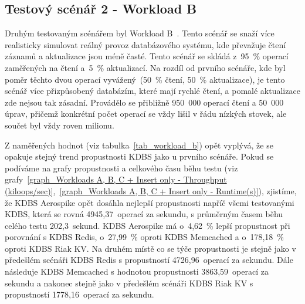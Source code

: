 \documentclass[czech,master,dept460,male,csharp,cpdeclaration]{diploma}
\begin{document}
	\subsection{Testový scénář 2 - Workload B}
	
	Druhým testovaným scénářem byl Workload B~\cite{workloads}. Tento scénář se snaží více realisticky simulovat reálný provoz databázového systému, kde převažuje čtení záznamů a aktualizace jsou méně časté. Tento scénář se skládá z~95~\% operací zaměřených na čtení a~5~\% aktualizací. Na rozdíl od prvního scénáře, kde byl poměr těchto dvou operací vyvážený~(50~\% čtení, 50~\% aktualizace), je tento scénář více přizpůsobený databázím, které mají rychlé čtení, a pomalé aktualizace zde nejsou tak zásadní. Provádělo se přibližně 950~000 operací čtení a 50~000 úprav, přičemž konkrétní počet operací se vždy lišil v řádu nízkých stovek, ale součet byl vždy roven milionu.
	
	Z naměřených hodnot (viz tabulka~\ref{tab_workload_b}) opět vyplývá, že se opakuje stejný trend propustnosti KDBS jako u prvního scénáře. Pokud se podíváme na grafy propustnosti a celkového času běhu testu (viz grafy~\ref{graph_Workloads A, B, C + Insert only - Throughput (kiloops/sec)},~\ref{graph_Workloads A, B, C + Insert only - Runtime(s)}), zjistíme, že KDBS Aerospike opět dosáhla nejlepší propustnosti napříč všemi testovanými KDBS, která se rovná 4945,37~operací za sekundu, s průměrným časem běhu celého testu 202,3~sekund. KDBS Aerospike má o~4,62~\% lepší propustnost při porovnání s KDBS Redis, o~27,99~\% oproti KDBS Memcached a o~178,18~\% oproti KDBS Riak KV. Na druhém místě co se týče propustnosti je stejně jako v předešlém scénáři KDBS Redis s propustností 4726,96~operací za sekundu. Dále následuje KDBS Memcached s hodnotou propustnosti 3863,59~operací za sekundu a nakonec stejně jako v předešlém scénáři KDBS Riak KV s propustností 1778,16~operací za sekundu.
	
\end{document}
